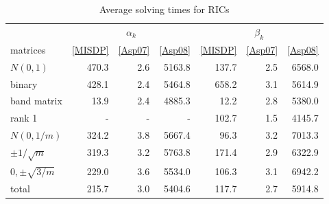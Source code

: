 \begin{table} 
 \begin{scriptsize} \caption{Average solving times for RICs} 
 \label{lhsRhsTime} 
 \begin{tabular*}{\linewidth}{@{}l@{\;\;\extracolsep{\fill}}rrrrrr@{}}\toprule 
  & \multicolumn{3}{c}{$\alpha_k$} & \multicolumn{3}{c}{$\beta_k$} \\ 
\cmidrule(r){2-4} \cmidrule(l){5-7} 
 matrices & \eqref{MISDP} & \eqref{Asp07} & \eqref{Asp08} & \eqref{MISDP} & \eqref{Asp07} & \eqref{Asp08} \\ \midrule 
$N(0,1)$& \num{470.3} & \num{2.6} & \num{5163.8} & \num{137.7} & \num{2.5} & \num{6568.0} \\ 
 binary& \num{428.1} & \num{2.4} & \num{5464.8} & \num{658.2} & \num{3.1} & \num{5614.9} \\ 
 band matrix& \num{13.9} & \num{2.4} & \num{4885.3} & \num{12.2} & \num{2.8} & \num{5380.0} \\ 
 rank 1& - & - & - & \num{102.7} & \num{1.5} & \num{4145.7} \\ 
 $N(0,1/m)$& \num{324.2} & \num{3.8} & \num{5667.4} & \num{96.3} & \num{3.2} & \num{7013.3} \\ 
 $\pm 1/\sqrt{m}$& \num{319.3} & \num{3.2} & \num{5763.8} & \num{171.4} & \num{2.9} & \num{6322.9} \\ 
 $0, \pm \sqrt{3/m}$& \num{229.0} & \num{3.6} & \num{5534.0} & \num{106.3} & \num{3.1} & \num{6942.2} \\ 
 \midrule 
total & \num{215.7} & \num{3.0} & \num{5404.6} & \num{117.7} & \num{2.7} & \num{5914.8} \\ 
 \bottomrule 
 \end{tabular*} 
 \end{scriptsize} 
 \end{table} 
